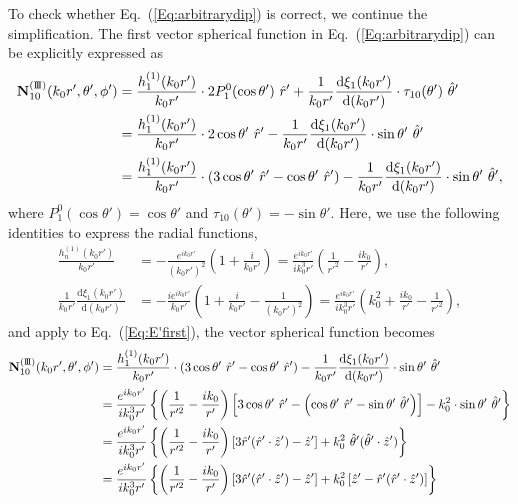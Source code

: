 \documentclass[journal=jacsat,manuscript=article,layout=traditional]{achemso}
\newcommand*\diff{\mathrm{d}}
\newcommand{\joinR}{\hspace{-.17em}}
\newcommand{\RomanI}{\scriptsize\textrm{I}}
\newcommand{\RomanIII}{\mbox{\RomanI\joinR\RomanI\joinR\RomanI}}
\begin{document}
To check whether Eq.~(\ref{Eq:arbitrarydip}) is correct, we continue the simplification.
The first vector spherical function in Eq.~(\ref{Eq:arbitrarydip}) can be explicitly expressed as
\begin{align}
    \nonumber
    \vb{N}_{10}^{(\RomanIII)}(k_0r',\theta',\phi')&=
    \frac{h_1^{(1)}(k_0r')}{k_0r'} \cdot 2P_1^0(\cos{\theta}')~\hat{r}'+
    \frac{1}{k_0r'}\frac{\diff \xi_1(k_0r')}{\diff(k_0r')}\cdot \tau_{10}(\theta')~\hat{\theta}'\\
    \nonumber
    &=
    \frac{h_1^{(1)}(k_0r')}{k_0r'} \cdot 2\cos\theta'~\hat{r}'-
    \frac{1}{k_0r'}\frac{\diff \xi_1(k_0r')}{\diff(k_0r')}\cdot \sin\theta'~\hat{\theta}'\\
    &=
    \frac{h_1^{(1)}(k_0r')}{k_0r'} \cdot \left(3\cos\theta'~\hat{r}'-\cos\theta'~\hat{r}'\right)-
    \frac{1}{k_0r'}\frac{\diff \xi_1(k_0r')}{\diff(k_0r')}\cdot \sin\theta'~\hat{\theta}',
    \label{Eq:E'first}
\end{align}
where $P_1^0(\cos\theta')=\cos\theta'$ and $\tau_{10}(\theta')=-\sin\theta'$.
Here, we use the following identities to express the radial functions,
\begin{subequations}
    \begin{align}
        \frac{h_n^{(1)}(k_0r')}{k_0r'} &= -\frac{e^{ik_0r'}}{(k_0r')^2}\left(1+\frac{i}{k_0r'}\right)= \frac{e^{ik_0r'}}{ik_0^3r'}\left(\frac{1}{r'^2}-\frac{ik_0}{r'}\right),\\
        \frac{1}{k_0r'}\frac{\diff\xi_1(k_0r')}{\diff(k_0r')} &=-\frac{ie^{ik_0r'}}{k_0r'}\left(1+\frac{i}{k_0r'}-\frac{1}{(k_0r')^2}\right)
        =\frac{e^{ik_0r'}}{ik_0^3r'}\left(k_0^2+\frac{ik_0}{r'}-\frac{1}{r'^2}\right),
    \end{align}
\end{subequations}
and apply to Eq.~(\ref{Eq:E'first}), the vector spherical function becomes
\begin{align}
    \nonumber
    \vb{N}_{10}^{(\RomanIII)}(k_0r',\theta',\phi')
    &=
    \frac{h_1^{(1)}(k_0r')}{k_0r'} \cdot \left(3\cos\theta'~\hat{r}'-\cos\theta'~\hat{r}'\right)-
    \frac{1}{k_0r'}\frac{\diff \xi_1(k_0r')}{\diff(k_0r')}\cdot \sin\theta'~\hat{\theta}'\\
    \nonumber
    &=
    \frac{e^{ik_0r'}}{ik_0^3r'}\left\{\left(\frac{1}{r'^2}-\frac{ik_0}{r'}\right)\left[3\cos\theta'~\hat{r}'-\left(\cos\theta'~\hat{r}'-\sin\theta'~\hat{\theta}'\right)\right]-
    k_0^2\cdot \sin\theta'~\hat{\theta}'\right\}\\
    \nonumber
    &=
    \frac{e^{ik_0r'}}{ik_0^3r'}\left\{
    \left(\frac{1}{r'^2}-\frac{ik_0}{r'}\right)\left[3\hat{r}'(\hat{r}'\cdot\hat{z}')-\hat{z}'\right]+k_0^2~\hat{\theta}'(\hat{\theta}'\cdot\hat{z}')
    \right\}\\
    &=
    \frac{e^{ik_0r'}}{ik_0^3r'}\left\{
    \left(\frac{1}{r'^2}-\frac{ik_0}{r'}\right)\left[3\hat{r}'(\hat{r}'\cdot\hat{z}')-\hat{z}'\right]+k_0^2\left[\hat{z}'-\hat{r}'(\hat{r}'\cdot\hat{z}')\right]
    \right\}
    \label{Eq:N10}
\end{align}
\end{document}
